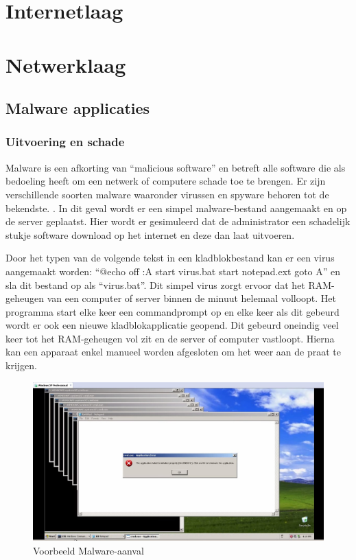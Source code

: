 \documentclass[pdftex,a4paper,12pt]{report}
\begin{document}
\section{Internetlaag}

\section{Netwerklaag}
\subsection{Malware applicaties}
\subsubsection{Uitvoering en schade}
Malware is een afkorting van "`malicious software"' en betreft alle software die als bedoeling heeft om een netwerk of computere schade toe te brengen. Er zijn verschillende soorten malware waaronder virussen en spyware behoren tot de bekendste. \citep{Moir2003}. In dit geval wordt er een simpel malware-bestand aangemaakt en op de server geplaatst. Hier wordt er gesimuleerd dat de administrator een schadelijk stukje software download op het internet en deze dan laat uitvoeren. \newline

Door het typen van de volgende tekst in een kladblokbestand kan er een virus aangemaakt worden: "`@echo off :A start virus.bat start notepad.ext goto A"' en sla dit bestand op als "`virus.bat"'. Dit simpel virus zorgt ervoor dat het RAM-geheugen van een computer of server binnen de minuut helemaal volloopt. Het programma start elke keer een commandprompt op en elke keer als dit gebeurd wordt er ook een nieuwe kladblokapplicatie geopend. Dit gebeurd oneindig veel keer tot het RAM-geheugen vol zit en de server of computer vastloopt. Hierna kan een apparaat enkel manueel worden afgesloten om het weer aan de praat te krijgen.

\begin{figure}[h!]
\begin{center}
\includegraphics[scale=0.60]{img/MalwareVoorbeeld}
\end{center}
\caption{Voorbeeld Malware-aanval}
\end{figure}
\end{document}
